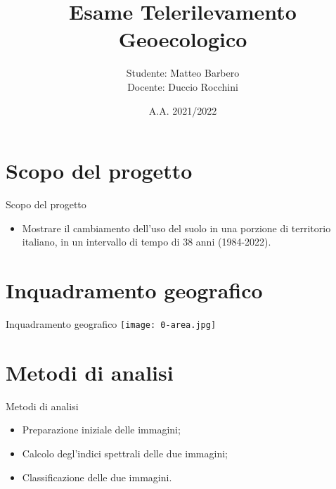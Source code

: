 \documentclass{beamer}
\title{Esame Telerilevamento Geoecologico}
\institute{Alma Mater Studiorum - Università di Bologna\\Telerilevamento Geo-Ecologico}
\author{Studente: Matteo Barbero\\Docente: Duccio Rocchini}
\date{A.A. 2021/2022}
\begin{document}
\maketitle



\section{Scopo del progetto}

\begin{frame}{Scopo del progetto}
\begin{itemize}
    \item  Mostrare il cambiamento dell'uso del suolo in una porzione di territorio italiano, in un intervallo di tempo di 38 anni (1984-2022).
\end{itemize}
\end{frame}


\section{Inquadramento geografico}

\begin{frame}{Inquadramento geografico}
    \texttt{[image: 0-area.jpg]}
    \centering
\end{frame}


\section{Metodi di analisi}

\begin{frame}{Metodi di analisi}
\begin{itemize}
    \item Preparazione iniziale delle immagini;
    
    \bigskip
    
    \item \pause Calcolo degl'indici spettrali delle due immagini;
    
    \bigskip
    
    \item \pause Classificazione delle due immagini.
\end{itemize}    
\end{frame}
\end{document}
